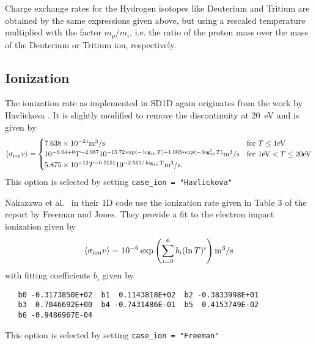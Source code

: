 \documentclass[amsmath,amssymb,a4]{revtex4-2}
\begin{document}
Charge exchange rates for the Hydrogen isotopes like Deuterium and Tritium are obtained by the same expressions given above, but using a rescaled temperature multiplied with the factor $m_p/m_i$, i.e. the ratio of the proton mass over the mass of the Deuterium or Tritium ion, respectively.


\subsection{Ionization}

The ionization rate as implemented in SD1D again originates from the work by Havlickova \cite{havlickova2013}. It is slightly modified to remove the discontinuity at 20~eV and is given by \cite{SD1D}
\begin{equation}\label{ionization_SD1D}
    \langle\sigma_{\rm ion} v\rangle = \begin{cases} 7.638 \times 10^{-21} {\rm m}^3/{\rm s}             & \mbox{for } T \le 1 {\rm eV} \\
                                        10^{-6.0d+0} T^{-2.987} 10^{-15.72 \exp(-\log_{10}T) + 1.603*exp(-\log_{10}^2T)} {\rm m}^3/{\rm s} & \mbox{for } 1 {\rm eV} < T \le 20 {\rm eV} \\
                                        5.875 \times 10^{-12} T^{-0.5151} 10^{-2.563/\log_{10}T} {\rm m}^3/{\rm s}. \end{cases}
\end{equation}
This option is selected by setting {\tt case\_ion = "Havlickova"}

Nakazawa et al.~\cite{nakazawa2000} in their 1D code use the ionization rate given in Table 3 of the report by Freeman and Jones. They provide a fit to the electron impact ionization given by
\begin{equation}\label{charge_exchange_FJ}
    \langle\sigma_{\rm ion} v\rangle = 10^{-6} \exp\left( \sum_{i=0}^6 b_i (\ln T)^i \right)  {\rm m}^3/{\rm s}
\end{equation}
with fitting coefficients $b_i$ given by
\begin{small}\begin{verbatim}
   b0 -0.3173850E+02  b1  0.1143818E+02  b2 -0.3833998E+01
   b3  0.7046692E+00  b4 -0.7431486E-01  b5  0.4153749E-02
   b6 -0.9486967E-04
\end{verbatim}\end{small}
This option is selected by setting {\tt case\_ion = "Freeman"}
\end{document}
